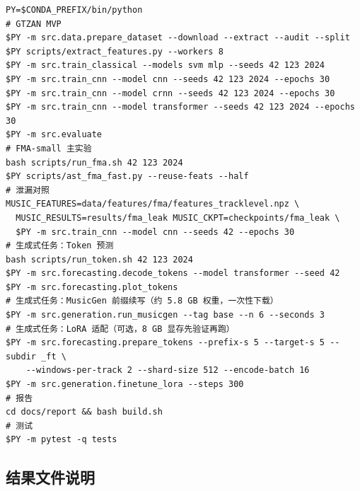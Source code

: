\documentclass[UTF8,10pt,a4paper]{ctexart}
\begin{document}
{\setmonofont{WenQuanYi Micro Hei Mono}%
\begin{verbatim}
PY=$CONDA_PREFIX/bin/python
# GTZAN MVP
$PY -m src.data.prepare_dataset --download --extract --audit --split
$PY scripts/extract_features.py --workers 8
$PY -m src.train_classical --models svm mlp --seeds 42 123 2024
$PY -m src.train_cnn --model cnn --seeds 42 123 2024 --epochs 30
$PY -m src.train_cnn --model crnn --seeds 42 123 2024 --epochs 30
$PY -m src.train_cnn --model transformer --seeds 42 123 2024 --epochs 30
$PY -m src.evaluate
# FMA-small 主实验
bash scripts/run_fma.sh 42 123 2024
$PY scripts/ast_fma_fast.py --reuse-feats --half
# 泄漏对照
MUSIC_FEATURES=data/features/fma/features_tracklevel.npz \
  MUSIC_RESULTS=results/fma_leak MUSIC_CKPT=checkpoints/fma_leak \
  $PY -m src.train_cnn --model cnn --seeds 42 --epochs 30
# 生成式任务：Token 预测
bash scripts/run_token.sh 42 123 2024
$PY -m src.forecasting.decode_tokens --model transformer --seed 42
$PY -m src.forecasting.plot_tokens
# 生成式任务：MusicGen 前缀续写（约 5.8 GB 权重，一次性下载）
$PY -m src.generation.run_musicgen --tag base --n 6 --seconds 3
# 生成式任务：LoRA 适配（可选，8 GB 显存先验证再跑）
$PY -m src.forecasting.prepare_tokens --prefix-s 5 --target-s 5 --subdir _ft \
    --windows-per-track 2 --shard-size 512 --encode-batch 16
$PY -m src.generation.finetune_lora --steps 300
# 报告
cd docs/report && bash build.sh
# 测试
$PY -m pytest -q tests
\end{verbatim}
}

\subsection{结果文件说明}
\end{document}

